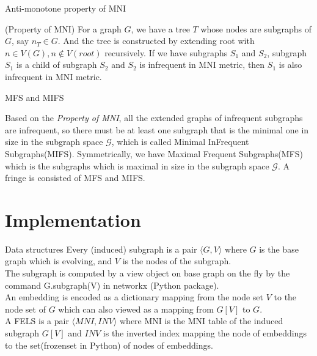 \documentclass[10pt,aspectratio=43,mathserif]{beamer}
\begin{document}
\begin{frame}{Anti-monotone property of MNI}

\begin{theorem}
    (Property of MNI\cite{grami}) For a graph $G$, we have a tree $T$  whose nodes are subgraphs of $G$, say $n_T\in G$. And the tree is constructed by extending root with $n\in V(G), n\notin V(root)$ recursively. If we have subgraphs $S_1$ and $S_2$, subgraph $S_1$ is a child of subgraph $S_2$ and $S_2$ is infrequent in MNI metric, then $S_1$ is also infrequent in MNI metric.
\end{theorem}

\end{frame}

\begin{frame}{MFS and MIFS}

    Based on the \emph{Property of MNI}, all the extended graphs of infrequent subgraphs are infrequent, so there must be at least one subgraph that is the minimal one in size in the subgraph space $\mathscr{G}$, which is called Minimal InFrequent Subgraphs(MIFS). Symmetrically, we have
Maximal Frequent Subgraphs(MFS) which is the subgraphs which is maximal in size in the subgraph space $\mathscr{G}$.
A fringe is consisted of MFS and MIFS.

\end{frame}
\section{Implementation}

\begin{frame}{Data structures}
    Every (induced) subgraph is a pair $\langle G, V\rangle$ where $G$ is the base graph which is evolving, and $V$ is the nodes of the subgraph. 
    \\
    The subgraph is computed by a view object on base graph on the fly by the command G.subgraph(V) in networkx (Python package). 
    \\
    An embedding is encoded as a dictionary mapping from the node set $V$ to the node set of $G$ which can also viewed as a mapping from $G[V]$ to $G$. 
    \\
    A FELS is a pair $\langle MNI, INV \rangle$ where MNI is the MNI table of the induced subgraph $G[V]$ and $INV$ is the inverted index mapping the node of embeddings to the set(frozenset in Python) of nodes of embeddings.
\end{frame}
\end{document}

